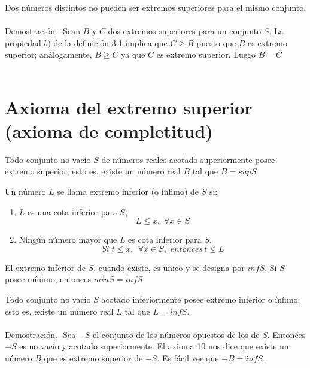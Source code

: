 \begin{teo}
Dos números distintos no pueden ser extremos superiores para el mismo conjunto.\\\\
Demostración.- \; Sean $B$ y $C$ dos extremos superiores para un conjunto $S$. La propiedad $b)$ de la definición 3.1 implica que $C\geq B$ puesto que $B$ es extremo superior; análogamente, $B \geq C$ ya que $C$ es extremo superior. Luego $B = C$ \\\\
\end{teo}

\section{Axioma del extremo superior (axioma de completitud)}

\begin{axioma}
Todo conjunto no vacío $S$ de números reales acotado superiormente posee extremo superior; esto es, existe un número real $B$ tal que $B=sup S$
\end{axioma}

\begin{def.}
Un número $L$ se llama extremo inferior (o ínfimo) de $S$ si:
\begin{enumerate}[\bfseries a)]
\item $L$ es una cota inferior para $S$,
$$L\leq x, \, \, \forall x \in S$$
\item Ningún número mayor que $L$ es cota inferior para $S$.
$$Si \; t\leq x, \, \; \forall x \in S, \, \, entonces \, t\leq L $$
\end{enumerate}
El extremo inferior de $S$, cuando existe, es único y se designa por $infS$. Si $S$ posee mínimo, entonces $minS=infS$\\
\end{def.}

\begin{teo}
Todo conjunto no vacío $S$ acotado inferiormente posee extremo inferior  o ínfimo; esto es, existe un número real $L$ tal que $L=infS$.\\\\
Demostración.- \; Sea $-S$ el conjunto de los números opuestos de los de $S$. Entonces $-S$ es no vacío y acotado superiormente. El axioma 10 nos dice que existe un número $B$ que es extremo superior de $-S$. Es fácil ver que $-B=infS$.\\\\
\end{teo}

